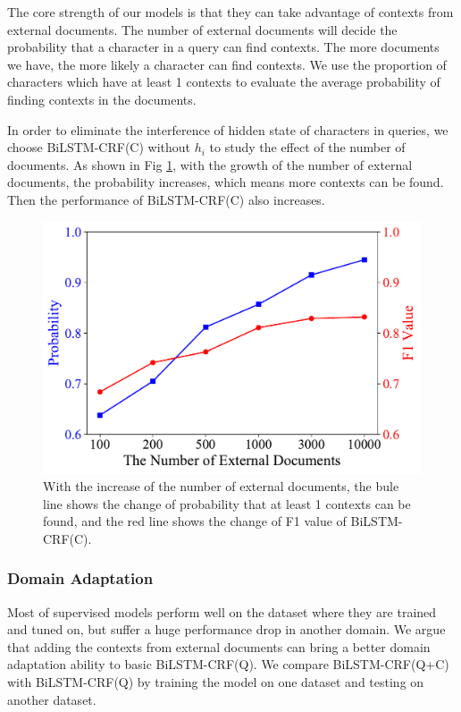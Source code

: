 The core strength of our models is that they can take advantage of contexts from external documents. The number of external documents will decide the probability that a character in a query can find contexts. The more documents we have, the more likely a character can find contexts. We use the proportion of characters which have at least 1 contexts to evaluate the average probability of finding contexts in the documents.

In order to eliminate the interference of hidden state of characters in queries, we choose BiLSTM-CRF(C) without $h_i$ to study the effect of the number of documents. As shown in Fig \ref{fig:alpha}, with the growth of the number of external documents, the probability increases, which means more contexts can be found. Then the performance of BiLSTM-CRF(C) also increases.

\begin{figure}[th]
	\centering
	\includegraphics[width=0.8\columnwidth]{figures/result-2.pdf}
	\caption{\small With the increase of the number of external documents, the bule line shows the change of probability that at least 1 contexts can be found, and the red line shows the change of F1 value of BiLSTM-CRF(C).}
	\label{fig:alpha}
	\vspace{-10pt}
\end{figure}


\subsubsection{Domain Adaptation}

Most of supervised models perform well on the dataset where they are trained and tuned on, but suffer a huge performance drop in another domain. We argue that adding the contexts from external documents can bring a better domain adaptation ability to basic BiLSTM-CRF(Q). We compare BiLSTM-CRF(Q+C) with BiLSTM-CRF(Q) by training the model on one dataset and testing on another dataset.

